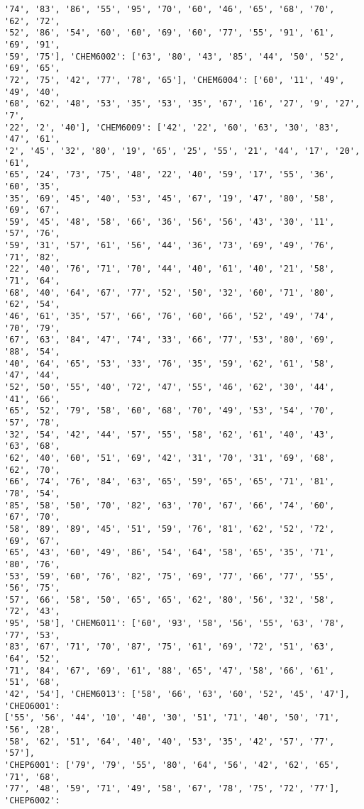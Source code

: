 \documentclass[11pt]{article}
\begin{document}
\begin{Verbatim}[commandchars=\\\{\}]
'74', '83', '86', '55', '95', '70', '60', '46', '65', '68', '70', '62', '72',
'52', '86', '54', '60', '60', '69', '60', '77', '55', '91', '61', '69', '91',
'59', '75'], 'CHEM6002': ['63', '80', '43', '85', '44', '50', '52', '69', '65',
'72', '75', '42', '77', '78', '65'], 'CHEM6004': ['60', '11', '49', '49', '40',
'68', '62', '48', '53', '35', '53', '35', '67', '16', '27', '9', '27', '7',
'22', '2', '40'], 'CHEM6009': ['42', '22', '60', '63', '30', '83', '47', '61',
'2', '45', '32', '80', '19', '65', '25', '55', '21', '44', '17', '20', '61',
'65', '24', '73', '75', '48', '22', '40', '59', '17', '55', '36', '60', '35',
'35', '69', '45', '40', '53', '45', '67', '19', '47', '80', '58', '69', '67',
'59', '45', '48', '58', '66', '36', '56', '56', '43', '30', '11', '57', '76',
'59', '31', '57', '61', '56', '44', '36', '73', '69', '49', '76', '71', '82',
'22', '40', '76', '71', '70', '44', '40', '61', '40', '21', '58', '71', '64',
'68', '40', '64', '67', '77', '52', '50', '32', '60', '71', '80', '62', '54',
'46', '61', '35', '57', '66', '76', '60', '66', '52', '49', '74', '70', '79',
'67', '63', '84', '47', '74', '33', '66', '77', '53', '80', '69', '88', '54',
'40', '64', '65', '53', '33', '76', '35', '59', '62', '61', '58', '47', '44',
'52', '50', '55', '40', '72', '47', '55', '46', '62', '30', '44', '41', '66',
'65', '52', '79', '58', '60', '68', '70', '49', '53', '54', '70', '57', '78',
'32', '54', '42', '44', '57', '55', '58', '62', '61', '40', '43', '63', '68',
'62', '40', '60', '51', '69', '42', '31', '70', '31', '69', '68', '62', '70',
'66', '74', '76', '84', '63', '65', '59', '65', '65', '71', '81', '78', '54',
'85', '58', '50', '70', '82', '63', '70', '67', '66', '74', '60', '67', '70',
'58', '89', '89', '45', '51', '59', '76', '81', '62', '52', '72', '69', '67',
'65', '43', '60', '49', '86', '54', '64', '58', '65', '35', '71', '80', '76',
'53', '59', '60', '76', '82', '75', '69', '77', '66', '77', '55', '56', '75',
'57', '66', '58', '50', '65', '65', '62', '80', '56', '32', '58', '72', '43',
'95', '58'], 'CHEM6011': ['60', '93', '58', '56', '55', '63', '78', '77', '53',
'83', '67', '71', '70', '87', '75', '61', '69', '72', '51', '63', '64', '52',
'71', '84', '67', '69', '61', '88', '65', '47', '58', '66', '61', '51', '68',
'42', '54'], 'CHEM6013': ['58', '66', '63', '60', '52', '45', '47'], 'CHEO6001':
['55', '56', '44', '10', '40', '30', '51', '71', '40', '50', '71', '56', '28',
'58', '62', '51', '64', '40', '40', '53', '35', '42', '57', '77', '57'],
'CHEP6001': ['79', '79', '55', '80', '64', '56', '42', '62', '65', '71', '68',
'77', '48', '59', '71', '49', '58', '67', '78', '75', '72', '77'], 'CHEP6002':

\end{Verbatim}
\end{document}
